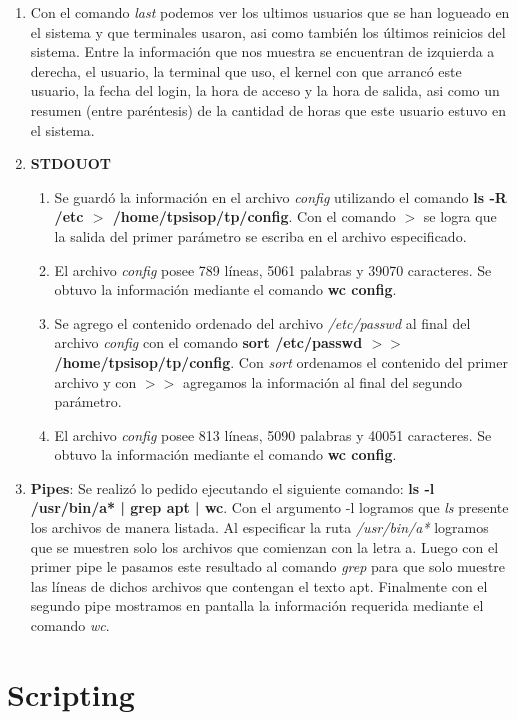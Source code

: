\documentclass[a4paper,11pt] {article}
\begin{document}
\begin{enumerate}
	\item Con el comando \textit{last} podemos ver los ultimos usuarios que se han logueado en el sistema y que 	terminales usaron, asi como tambi\'en los \'ultimos reinicios del sistema. Entre la informaci\'on que nos muestra se 	encuentran de izquierda a derecha, el usuario, la terminal que uso, el kernel con que arranc\'o este usuario, la 	fecha del login, la hora de acceso y la hora de salida, asi como un resumen (entre par\'entesis) de la cantidad de 	horas que este usuario estuvo en el sistema.
	\item \textbf{STDOUOT}
		\begin{enumerate}
			\item Se guard\'o la informaci\'on en el archivo \textit{config} utilizando el comando \textbf{ls -R /etc 			$>$ /home/tpsisop/tp/config}. Con el comando $>$ se logra que la salida del primer par\'ametro se escriba 			en el archivo especificado.
			\item El archivo \textit{config} posee 789 l\'ineas, 5061 palabras y 39070 caracteres. Se obtuvo la 				informaci\'on mediante el comando \textbf{wc config}.
			\item Se agrego el contenido ordenado del archivo \textit{/etc/passwd} al final del archivo \textit				{config} con el comando \textbf{sort /etc/passwd $>>$ /home/tpsisop/tp/config}. Con \textit{sort} 				ordenamos el contenido del primer archivo y con $>>$ agregamos la informaci\'on al final del segundo par\'ametro.
			\item El archivo \textit{config} posee 813 l\'ineas, 5090 palabras y 40051 caracteres. Se obtuvo la 				informaci\'on mediante el comando \textbf{wc config}.
		\end{enumerate}
	\item \textbf{Pipes}: Se realiz\'o lo pedido ejecutando el siguiente comando: \textbf{ls -l /usr/bin/a* | grep apt | 	wc}. Con el argumento -l logramos que \textit{ls} presente los archivos de manera listada. Al especificar la ruta 	\textit{/usr/bin/a*} logramos que se muestren solo los archivos que comienzan con la letra a. Luego con el primer 	pipe le pasamos este resultado al comando \textit{grep} para que solo muestre las l\'ineas de dichos archivos que 	contengan el texto apt. Finalmente con el segundo pipe mostramos en pantalla la informaci\'on requerida mediante el 	comando \textit{wc}.
\end{enumerate}

\section*{Scripting}
\end{document}
